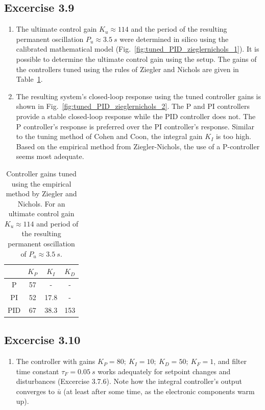 \documentclass[10pt,twoside,openright]{article}
\begin{document}
\subsection*{Excercise 3.9}

\begin{enumerate}
\setlength\itemsep{0em}
\item The ultimate control gain $K_u \approx 114$ and the period of the resulting permanent oscillation $P_u \approx 3.5~s$ were determined in silico using the calibrated mathematical model (Fig.~\ref{fig:tuned_PID_zieglernichols_1}). It is possible to determine the ultimate control gain using the setup. The gains of the controllers tuned using the rules of Ziegler and Nichols are given in Table~\ref{tab:ziegler_nichols_tuned}.

\item The resulting system's closed-loop response using the tuned controller gains is shown in Fig.~\ref{fig:tuned_PID_zieglernichols_2}. The P and PI controllers provide a stable closed-loop response while the PID controller does not. The P controller's response is preferred over the PI controller's response. Similar to the tuning method of Cohen and Coon, the integral gain $K_I$ is too high. Based on the empirical method from Ziegler-Nichols, the use of a P-controller seems most adequate. 
\end{enumerate}

\begin{table}[h!]
\caption{Controller gains tuned using the empirical method by Ziegler and Nichols. For an ultimate control gain $K_u \approx 114$ and period of the resulting permanent oscillation of $P_u \approx 3.5~s$.}
\centering
 \begin{tabular}{|c | c c c|} 
 \hline
  & $K_P$ & $K_I$ & $K_D$ \\ [0.5ex] 
 \hline
 P & 57 & - & - \\ [3mm] 
 PI & 52 & 17.8 & - \\ [3mm] 
 PID & 67 & 38.3 & 153 \\ [3mm] 
 \hline
 \end{tabular}
 \label{tab:ziegler_nichols_tuned}
\end{table}

\subsection*{Excercise 3.10}

\begin{enumerate}
	\setlength\itemsep{0em}
	\item The controller with gains $K_P=80;~ K_I=10;~ K_D=50;~ K_F=1$, and filter time constant $\tau_F=0.05~s$ works adequately for setpoint changes and disturbances (Excercise 3.7.6). Note how the integral controller's output converges to $\bar{u}$ (at least after some time, as the electronic components warm up).
\end{enumerate}
\end{document}
